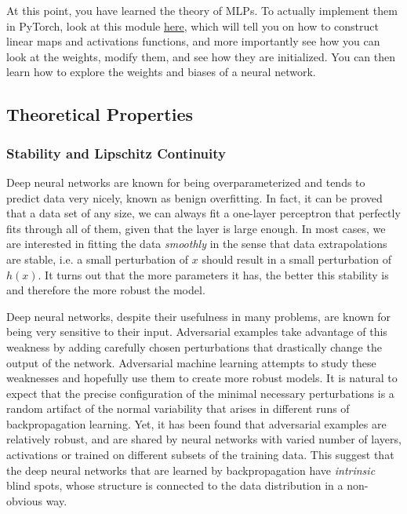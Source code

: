 \documentclass{article}
\begin{document}
    \begin{code} 
      At this point, you have learned the theory of MLPs. To actually implement them in PyTorch, look at this module \href{code/1/parameters.ipynb}{here}, which will tell you on how to construct linear maps and activations functions, and more importantly see how you can look at the weights, modify them, and see how they are initialized. You can then learn how to explore the weights and biases of a neural network. 
    \end{code}

  \subsection{Theoretical Properties} 

    \subsubsection{Stability and Lipschitz Continuity}

      Deep neural networks are known for being overparameterized and tends to predict data very nicely, known as benign overfitting. In fact, it can be proved that a data set of any size, we can always fit a one-layer perceptron that perfectly fits through all of them, given that the layer is large enough. In most cases, we are interested in fitting the data \textit{smoothly} in the sense that data extrapolations are stable, i.e. a small perturbation of $x$ should result in a small perturbation of $h(x)$. It turns out that the more parameters it has, the better this stability is and therefore the more robust the model. 

      Deep neural networks, despite their usefulness in many problems, are known for being very sensitive to their input. Adversarial examples take advantage of this weakness by adding carefully chosen perturbations that drastically change the output of the network. Adversarial machine learning attempts to study these weaknesses and hopefully use them to create more robust models. It is natural to expect that the precise configuration of the minimal necessary perturbations is a random artifact of the normal variability that arises in different runs of backpropagation learning. Yet, it has been found that adversarial examples are relatively robust, and are shared by neural networks with varied number of layers, activations or trained on different subsets of the training data. This suggest that the deep neural networks that are learned by backpropagation have \textit{intrinsic} blind spots, whose structure is connected to the data distribution in a non-obvious way. 
\end{document}
